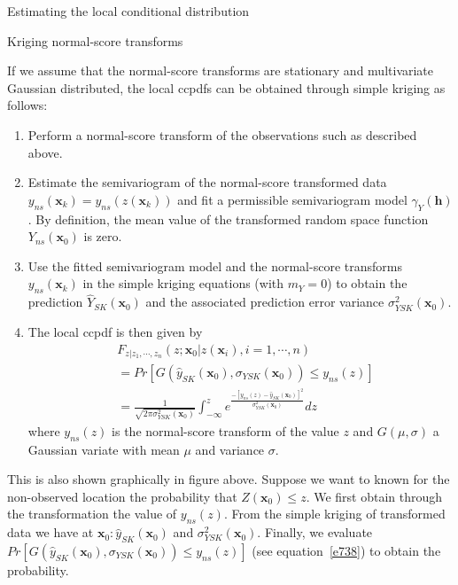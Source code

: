 \documentclass[8pt]{beamer}
\renewcommand{\emph}[1]{\textcolor{myorange}{#1}}
\begin{document}
\begin{frame}{Estimating the local conditional distribution}
     \begin{block}{Kriging normal-score transforms}
    \end{block}
            \vspace{-5pt}
            If we assume that the \emph{normal-score transforms} are \emph{stationary} and \emph{multivariate Gaussian distributed},  the \emph{local ccpdfs} can be obtained through \emph{simple kriging} as follows:
    \begin{enumerate}
        \item Perform a \emph{normal-score transform} of the observations such as described above.
        \item Estimate the \emph{semivariogram} of the \emph{normal-score transformed data} $y_{ns}(\mathbf{x}_k) = y_{ns}(z(\mathbf{x}_k))$ and fit a permissible semivariogram model $\gamma_Y (\mathbf{h})$. By definition, the mean value of the \emph{transformed random space function} $Y_{ns} (\mathbf{x}_0)$ is zero.
        \item Use the fitted \emph{semivariogram model} and the \emph{normal-score transforms} $y_{ns} (\mathbf{x}_k)$ in the \emph{simple kriging} equations (with $m_Y =0$) to obtain the \emph{prediction} $\hat{Y}_{SK} (\mathbf{x}_0)$ and the associated \emph{prediction error variance} $\sigma_{YSK}^2 (\mathbf{x}_0)$.
        \item The local \emph{ccpdf} is then given by
            \vspace{-5pt}
            \begin{equation}
                \begin{aligned}
                    &F_{z|z_1,\cdots,z_n} (z; \mathbf{x}_0 | z(\mathbf{x}_i), i=1,\cdots,n) \\
                    &= Pr\left[G\left(\hat{y}_{SK}(\mathbf{x}_0), \sigma_{YSK} (\mathbf{x}_0) \right) \leq y_{ns} (z) \right]\\
                    &= \frac{1}{\sqrt{2\pi \sigma_{YSK}^2 (\mathbf{x}_0)}} \int_{-\infty}^z e^{\frac{-\left[y_{ns}(z)-\hat{y}_{SK}(\mathbf{x}_0) \right]^2}{\sigma_{YSK}^2 (\mathbf{x}_0)}} dz
                \end{aligned}
                \label{e738}
            \end{equation}
            where $y_{ns} (z)$ is the \emph{normal-score transform} of the value $z$ and $G(\mu, \sigma)$ a \emph{Gaussian variate} with \emph{mean} $\mu$ and \emph{variance} $\sigma$.
    \end{enumerate}
    This is also shown graphically in figure above. Suppose we want to known for the non-observed location the probability that $Z(\mathbf{x}_0) \leq z$. We first obtain through the transformation the value of $y_{ns}(z)$. From the \emph{simple kriging} of transformed data we have at $\mathbf{x}_0 : \hat{y}_{SK}(\mathbf{x}_0)$ and $\sigma_{YSK}^2 (\mathbf{x}_0)$. Finally, we evaluate $Pr\left[G\left(\hat{y}_{SK}(\mathbf{x}_0), \sigma_{YSK}(\mathbf{x}_0)\right) \leq y_{ns}(z)\right]$ (see equation~\ref{e738}) to obtain the probability.
\end{frame}
\end{document}
